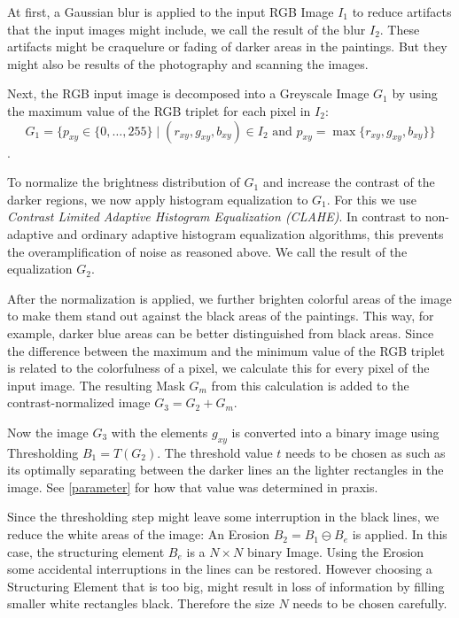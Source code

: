 \documentclass[serif,article,noparskip]{agse-thesis}
\begin{document}
At first, a Gaussian blur is applied to the input RGB Image $I_1$ to reduce
artifacts that the input images might include, we call the result of the blur
$I_2$. These artifacts might be craquelure or fading of darker areas in the
paintings. But they might also be results of the photography and scanning the
images.

Next, the RGB input image is decomposed into a Greyscale Image $G_1$ by using
the maximum value of the RGB triplet for each pixel in $I_2$:
$$G_1 = \{p_{xy} \in \{0,\ldots,255\} \mid (r_{xy},g_{xy},b_{xy})\in I_2\text{ and }p_{xy}=\max\{r_{xy},g_{xy},b_{xy}\}\}$$.

To normalize the brightness distribution of $G_1$ and increase the contrast of
the darker regions, we now apply histogram equalization to $G_1$. For this we
use \textit{Contrast Limited Adaptive Histogram Equalization (CLAHE)}. In
contrast to non-adaptive and ordinary adaptive histogram equalization
algorithms, this prevents the overamplification of noise as reasoned above. We
call the result of the equalization $G_2$. \cite{Pizer1987}

After the normalization is applied, we further brighten colorful areas of the
image to make them stand out against the black areas of the paintings. This way,
for example, darker blue areas can be better distinguished from black areas.
Since the difference between the maximum and the minimum value of the RGB
triplet is related to the colorfulness of a pixel, we calculate this for every
pixel of the input image. The resulting Mask $G_m$ from this calculation is added to
the contrast-normalized image $G_3 = G_2 + G_m$.

Now the image $G_3$ with the elements $g_{xy}$ is converted into a binary image
using Thresholding $B_1 = T(G_2)$. The threshold value $t$ needs to be chosen
as such as its optimally separating between the darker lines an the lighter
rectangles in the image. See \ref{parameter} for how that value was determined
in praxis.

Since the thresholding step might leave some interruption in the black lines, we
reduce the white areas of the image: An Erosion $B_2 = B_1 \ominus B_e$ is
applied. In this case, the structuring element $B_e$ is a $N\times N$ binary
Image. Using the Erosion some accidental interruptions in the lines can be
restored. However choosing a Structuring Element that is too big, might
result in loss of information by filling smaller white rectangles black.
Therefore the size $N$ needs to be chosen carefully.
\end{document}
